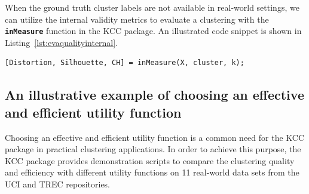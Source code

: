 \documentclass[10pt]{acmtrans2e}
\newcommand{\package}[1]{\textsf{#1}\xspace} %
\newcommand{\function}[1]{\textbf{\texttt{#1}}}
\begin{document}
When the ground truth cluster labels are not available in real-world settings, we can utilize the internal validity metrics to evaluate a clustering with the \function{inMeasure} function in the \package{KCC} package. An illustrated code snippet is shown in Listing~\ref{lst:evaqualityinternal}.
\begin{lstlisting}[caption={Using \function{inMeasure} to evaluate the clustering quality.},label=lst:evaqualityinternal]
[Distortion, Silhouette, CH] = inMeasure(X, cluster, k);
\end{lstlisting}

\subsection{An illustrative example of choosing an effective and efficient utility function}\label{subsec:example1}
Choosing an effective and efficient utility function is a common need for the \package{KCC} package in practical clustering applications. In order to achieve this purpose, the \package{KCC} package provides demonstration scripts to compare the clustering quality and efficiency with different utility functions on 11 real-world data sets from the UCI and TREC repositories.
\end{document}
